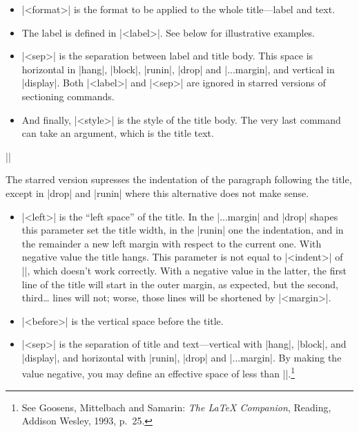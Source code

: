\documentclass{ltxguide}
\begin{document}
\begin{itemize}

\item |<format>| is the format to be applied to the whole 
title---label and text.

\item The label is defined in |<label>|.  See below for illustrative 
examples.

\item |<sep>| is the separation between label and title body.  This 
space is horizontal in |hang|, |block|, |runin|, |drop| and |...margin|, and
vertical in |display|. Both |<label>| and |<sep>| are ignored in
starred versions of sectioning commands.

\item And finally, |<style>| is the style of the title body. The 
very last command can take an argument, which is the title text.
\end{itemize}

\begin{decl}
||
\end{decl}

The starred version supresses the indentation of the paragraph 
following the title, except in |drop| and |runin| where this
alternative does not make sense.
\begin{itemize}
\item |<left>| is the ``left space'' of the title.  In the |...margin|
and |drop| shapes this parameter set the title width, in the |runin| one the
indentation, and in the remainder a new left margin with
respect to the current one. With negative value the title 
hangs. This parameter is not equal to |<indent>| of 
|\@startsection|, which doesn't work correctly.
With a negative value in the latter, the first line of the title will
start in the outer margin, as expected, but the second, third\dots{} 
lines will not; worse, those lines will be shortened by |<margin>|.

\item |<before>| is the vertical space before the title.
\item |<sep>| is the separation of title and text---vertical with |hang|,
|block|, and |display|, and horizontal with |runin|, |drop| and |...margin|.
By making the value negative, you may define an effective space
of less than |\parskip|.\footnote{See Goosens, Mittelbach and
Samarin: \textit{The \LaTeX{} Companion}, Reading, Addison Wesley, 
1993, p.~25.}
\end{itemize}
\end{document}
